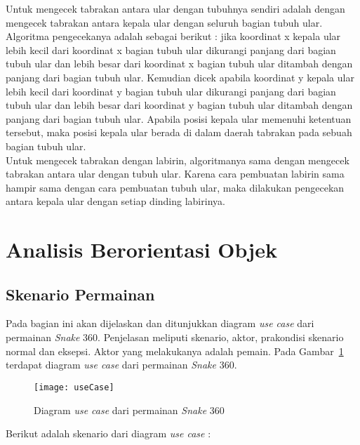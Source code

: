 Untuk mengecek tabrakan antara ular dengan tubuhnya sendiri adalah dengan mengecek tabrakan antara kepala ular dengan seluruh bagian tubuh ular. Algoritma pengecekanya adalah sebagai berikut : jika koordinat x kepala ular lebih kecil dari koordinat x bagian tubuh ular dikurangi panjang dari bagian tubuh ular dan lebih besar dari koordinat x bagian tubuh ular ditambah dengan panjang dari bagian tubuh ular. Kemudian dicek apabila koordinat y kepala ular lebih kecil dari koordinat y bagian tubuh ular dikurangi panjang dari bagian tubuh ular dan lebih besar dari koordinat y bagian tubuh ular ditambah dengan panjang dari bagian tubuh ular. Apabila posisi kepala ular memenuhi ketentuan tersebut, maka posisi kepala ular berada di dalam daerah tabrakan pada sebuah bagian tubuh ular. \\

Untuk mengecek tabrakan dengan labirin, algoritmanya sama dengan mengecek tabrakan antara ular dengan tubuh ular. Karena cara pembuatan labirin sama hampir sama dengan cara pembuatan tubuh ular, maka dilakukan pengecekan antara kepala ular dengan setiap dinding labirinya.

\section{Analisis Berorientasi Objek}

\subsection{Skenario Permainan}
Pada bagian ini akan dijelaskan dan ditunjukkan diagram \textit{use case} dari permainan \textit{Snake} 360. Penjelasan meliputi skenario, aktor, prakondisi skenario normal dan eksepsi. Aktor yang melakukanya adalah pemain. Pada Gambar~\ref{fig:useCase} terdapat diagram \textit{use case} dari permainan \textit{Snake} 360.

\begin{figure}[H]
	\centering  
	\texttt{[image: useCase]}  
	\caption[Diagram \textit{use case} dari permainan \textit{Snake} 360]{Diagram \textit{use case} dari permainan \textit{Snake} 360}
	\label{fig:useCase} 
\end{figure}

Berikut adalah skenario dari diagram \textit{use case} :

